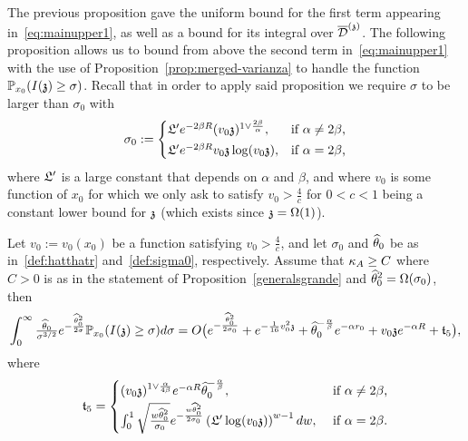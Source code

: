 The previous proposition gave the uniform bound for the first term appearing in~\eqref{eq:mainupper1}, as well as a bound for its integral over $\ndt$. The following proposition allows us to bound from above the second term in~\eqref{eq:mainupper1} with the use of Proposition~\ref{prop:merged-varianza} to handle the function $\PP_{x_0}(\II{\ss}\geq\sigma)$. Recall that in order to apply said proposition we require $\sigma$ to be larger than $\sigma_0$ with
\begin{equation}\label{def:sigma0}
\sigma_0 := \begin{cases}
\auxl'e^{-2\beta R}(v_0\ss)^{1\vee\frac{2\beta}{\alpha}}, &
\text{if $\alpha \neq 2\beta$,} \\[2pt]
\auxl'e^{-2\beta R}v_0\ss\log(v_0\ss), &
\text{if $\alpha=2\beta$,}
\end{cases}
\end{equation}
where $\auxl'$ is a large constant that depends on $\alpha$ and $\beta$, and where $v_0$ is some function of $x_0$ for which we only ask to satisfy $v_0>\frac{4}{c}$ for $0<c< 1$ being a constant lower bound for $\ss$ (which exists since $\ss=\Omega(1)$).

\begin{proposition}\label{prop:splitterms}
Let $v_0:=v_0(x_0)$ be a function satisfying $v_0>\frac{4}{c}$, and let $\sigma_0$ and $\hatt$ be as in~\eqref{def:hatthatr} and~\eqref{def:sigma0}, respectively. Assume that $\KA\geq C$ where $C>0$ is as in the statement of Proposition~\ref{generalsgrande} and $\hatt^2=\Omega(\sigma_0)$, then
\begin{equation}\label{eq:mainterms}
\int_{0}^{\infty}\tfrac{\hatt}{\sigma^{3/2}}e^{-\frac{\hatt^2}{2\sigma}}\PP_{x_0}(\II{\ss}\geq\sigma)d\sigma=O\big(e^{-\frac{\hatt^2}{2\sigma_0}}+e^{-\frac{1}{16}v_0^2\ss}+\hatt^{-\frac{\alpha}{\beta}}e^{-\alpha r_0}+v_0\ss e^{-\alpha R}+\mathfrak{t}_5\big),
\end{equation}
where
\[\mathfrak{t}_5=\begin{cases}(v_0\ss)^{1\vee\frac{\alpha}{4\beta}}e^{-\alpha R}\hatt^{-\frac{\alpha}{\beta}}, &\text{ if $\alpha\neq2\beta$,} \\[2pt]
\int_{0}^{1}\sqrt{\tfrac{w\hatt^2}{\sigma_0}}e^{-\frac{w\hatt^2}{2\sigma_0}}\left(\auxl'\log(v_0\ss)\right)^{w-1}dw, &\text{ if $\alpha=2\beta$}.\end{cases}\]
\end{proposition}



